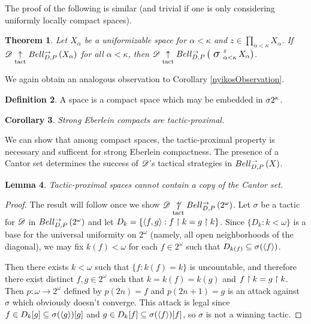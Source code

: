 \documentclass{amsart}
\newtheorem{theorem}{Theorem}[section]
\newtheorem{lemma}[theorem]{Lemma}
\newtheorem{corollary}[theorem]{Corollary}
\theoremstyle{definition}
\newtheorem{definition}[theorem]{Definition}
\begin{document}
  The proof of the following is similar (and trivial if one is
  only considering uniformly locally compact spaces).

  \begin{theorem}
    Let \(X_\alpha\) be a uniformizable space for \(\alpha<\kappa\)
    and \(z\in \prod_{\alpha<\kappa}X_\alpha\).
    If
    \(\mathscr{D}\underset{\text{tact}}{\uparrow}Bell_{D,P}^{\to}\left({X_\alpha}\right)\) for all \(\alpha<\kappa\),
    then
    \(\pl D\tactwin\bellAbsConGame{\sigmaProd_{\alpha<\kappa}^z X_\alpha}\).
  \end{theorem}

  We again obtain an analogous observation to Corollary
  \ref{nyikosObservation}.

  \begin{definition}
    A  space is a compact space which
    may be embedded in \(\sigma2^{\kappa}\).
  \end{definition}

  \begin{corollary}
    Strong Eberlein compacts are tactic-proximal.
  \end{corollary}

  We can show that among compact spaces, the tactic-proximal property is
  necessary and sufficent for strong Eberlein compactness.
  The presence of a Cantor set determines the success of \(\mathscr{D}\)'s
  tactical strategies in \(Bell_{D,P}^{\rightharpoonup}\left({X}\right)\).

  \begin{lemma}
    Tactic-proximal spaces cannot contain a copy of the Cantor set.
  \end{lemma}

  \begin{proof}
    The result will follow once we show
    \(\mathscr{D}\underset{\text{tact}}{\not\uparrow}Bell_{D,P}^{\to}\left({2^\omega}\right)\).
    Let \(\sigma\) be a tactic for \(\mathscr{D}\) in \(Bell_{D,P}^{\to}\left({2^\omega}\right)\)
    and let \(D_k=\{\langle f,g\rangle:f\restriction k = g\restriction k\}\). Since \(\{D_k:k<\omega\}\)
    is a base for the universal uniformity on \(2^\omega\)
    (namely, all open neighborhoods of the diagonal),
    we may fix \(k(f)<\omega\)
    for each \(f\in2^\omega\) such that \(D_{k(f)}\subseteq\sigma(\langle f\rangle)\).

    Then there exists \(k<\omega\) such that \(\{f:k(f)=k\}\) is uncountable,
    and therefore there exist distinct \(f,g\in2^\omega\)
    such that \(k=k(f)=k(g)\) and
    \(f\restriction k=g\restriction k\). Then \(p:\omega\to2^\omega\) defined by
    \(p(2n)=f\) and \(p(2n+1)=g\) is an attack against \(\sigma\) which
    obviously doesn't converge. This attack is legal since
    \(f\in D_k[g]\subseteq\sigma(\langle g\rangle)[g]\) and
    \(g\in D_k[f]\subseteq\sigma(\langle f\rangle)[f]\), so \(\sigma\) is not a winning
    tactic.
  \end{proof}
\end{document}
